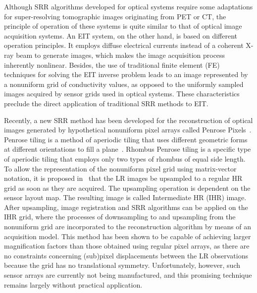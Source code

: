 \documentclass[10pt]{IEEEtran}
\begin{document}
Although SRR algorithms developed for optical systems require some adaptations for super-resolving tomographic images originating from PET or CT, the principle of operation of these systems is quite similar to that of optical image acquisition systems. An EIT system, on the other hand, is based on different operation principles. It employs diffuse electrical currents instead of a coherent X-ray beam to generate images, which makes the image acquisition process inherently nonlinear. Besides, the use of traditional finite element (FE) techniques for solving the EIT inverse problem leads to an image represented by a nonuniform grid of conductivity values, as opposed to the uniformly sampled images acquired by sensor grids used in optical systems. These characteristics preclude the direct application of traditional SRR methods to EIT.





Recently, a new SRR method has been developed for the reconstruction of optical images generated by hypothetical nonuniform pixel arrays called Penrose Pixels~\cite{Ben11}. Penrose tiling is a method of aperiodic tiling that uses different geometric forms at different orientations to fill a plane~\cite{Penrose74}. Rhombus Penrose tiling is a specific type of aperiodic tiling that employs only two types of rhombus of equal side length. To allow the representation of the nonuniform pixel grid using matrix-vector notation, it is proposed in~\cite{Ben11} that the LR images be upsampled to a regular HR grid as soon as they are acquired. The upsampling operation is dependent on the sensor layout map.  The resulting image is called Intermediate HR (IHR) image. After upsampling, image registration and SRR algorithms can be applied on the IHR grid, where the processes of downsampling to and upsampling from the nonuniform grid are incorporated to the reconstruction algorithm by means of an acquisition model. This method has been shown to be capable of achieving larger magnification factors than those obtained using regular pixel arrays, as there are no constraints concerning (sub)pixel displacements between the LR observations because the grid has no translational symmetry. Unfortunately, however, such sensor arrays are currently not being manufactured, and this promising technique remains largely without practical application.




\end{document}
